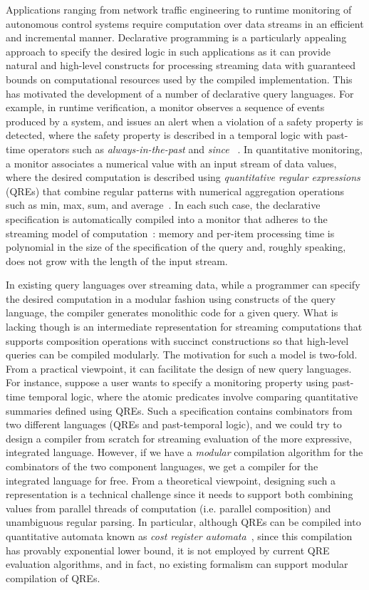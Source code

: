 Applications ranging from network traffic engineering to runtime monitoring of autonomous control systems
require computation over data streams in an efficient and incremental manner.
Declarative programming is a particularly appealing approach to specify the desired logic in such
applications as it can provide natural and high-level constructs for processing streaming data
with guaranteed bounds on computational resources used by the compiled implementation.
This has motivated the development of a number of declarative query languages.
For example, in runtime verification, a monitor observes a sequence of events produced by
a system, and issues an alert when a violation of a safety property is detected, where the safety property
is described in a temporal logic with past-time operators such as \emph{always-in-the-past} and \emph{since}
~\cite{manna2012temporal,havelund2004efficient}.
In quantitative monitoring, a monitor associates a numerical value with an input stream of data values,
where the desired computation is described using \emph{quantitative regular expressions} (QREs) that combine
regular patterns with numerical aggregation operations such as min, max, sum, and average~\cite{QRE,StreamQRE,YLMMAL2017NQRE}.
In each such case, the declarative specification is automatically compiled into a monitor that
adheres to the streaming model of computation~\cite{M2005DS}: memory and per-item
processing time is polynomial in the size of the specification of the query and, roughly speaking,
does not grow with the length of the input stream.

In existing query languages over streaming data, while a programmer can specify the desired computation
in a modular fashion using constructs of the query language, the compiler generates monolithic code for
a given query.
What is lacking though is an intermediate representation for streaming computations
that supports composition operations with succinct constructions so that high-level queries can be
compiled modularly. The motivation for such a model is two-fold. From a practical viewpoint,
it can facilitate the design of new query languages. For instance, suppose a user wants
to specify a monitoring property using past-time temporal logic, where the atomic
predicates involve comparing quantitative summaries defined using QREs.
Such a specification contains combinators from two different languages (QREs and past-temporal logic), and we could try to design a compiler from scratch for streaming evaluation of the more expressive, integrated language.
However, if we have a \emph{modular} compilation algorithm for the combinators of the two component languages, we get a compiler for the integrated language for free.
From a theoretical viewpoint, designing such a representation is a technical challenge since
it needs to support both combining values from parallel threads of computation (i.e. parallel composition) and unambiguous regular parsing.
In particular, although QREs can be compiled into quantitative automata known
as \emph{cost register automata}~\cite{AdADRY2013CRA}, since this compilation has provably exponential lower bound,
it is not employed by current QRE evaluation algorithms, and in fact, no existing formalism can support
modular compilation of QREs.

